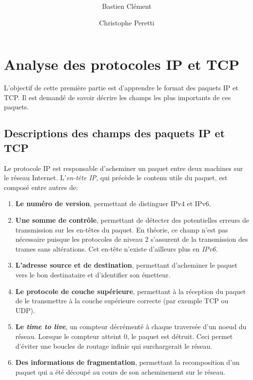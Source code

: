 \documentclass[11pt,a4paper]{article}
\author{Bastien Clément \and Christophe Peretti}
\title{{\normalsize \doccourse} \\ \doctitle }
\begin{document}
\maketitle
\vspace{1em}

\section{Analyse des protocoles IP et TCP}

L'objectif de cette première partie est d'apprendre le format des paquets IP et TCP. Il est demandé de savoir décrire les champs les plus importants de ces paquets.

\subsection{Descriptions des champs des paquets IP et TCP}

Le protocole IP est responsable d'acheminer un paquet entre deux machines sur le réseau Internet. L'\textit{en-tête IP}, qui précède le contenu utile du paquet, est composé entre autres de:

\begin{enumerate}
	\item \textbf{Le numéro de version}, permettant de distinguer IPv4 et IPv6.
	\item \textbf{Une somme de contrôle}, permettant de détecter des potentielles erreurs de transmission sur les en-têtes du paquet. En théorie, ce champ n'est pas nécessaire puisque les protocoles de niveau 2 s'assurent de la transmission des trames sans altérations. Cet en-tête n'existe d'ailleurs plus en \textit{IPv6}.
	\item \textbf{L'adresse source et de destination}, permettant d'acheminer le paquet vers le bon destinataire et d'identifier son émetteur.
	\item \textbf{Le protocole de couche supérieure}, permettant à la réception du paquet de le transmettre à la couche supérieure correcte (par exemple TCP ou UDP).
	\item \textbf{Le \textit{time to live}}, un compteur décrémenté à chaque traversée d'un noeud du réseau. Lorsque le compteur atteint 0, le paquet est détruit. Ceci permet d'éviter une boucles de routage infinie qui surchargerait le réseau.
	\item \textbf{Des informations de fragmentation}, permettant la recomposition d'un paquet qui a été découpé au cours de son acheminement sur le réseau.
\end{enumerate}
\end{document}
